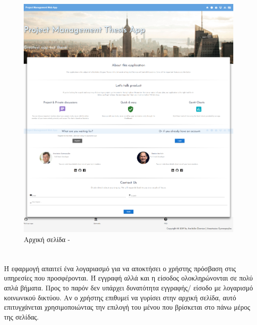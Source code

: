 \begin{figure}[!htb]
\centering
\includegraphics[scale=0.2]{images/homepage.png}
\caption{Αρχική σελίδα - }
\label{fig:homepage}
\end{figure}

\section{}
\pSpace Ή εφαρμογή απαιτεί ένα λογαριασμό για να αποκτήσει ο χρήστης πρόσβαση στις υπηρεσίες που προσφέρονται. Ή εγγραφή αλλά και η είσοδος ολοκληρώνονται σε πολύ απλά βήματα. Προς το παρόν δεν υπάρχει δυνατότητα εγγραφής/ είσοδο με λογαρισμό κοινωνικού δικτύου. Αν ο χρήστης επιθυμεί να γυρίσει στην αρχική σελίδα, αυτό επιτυγχάνεται χρησιμοποιώντας την επιλογή του μένου που βρίσκεται στο πάνω μέρος της σελίδας. 

